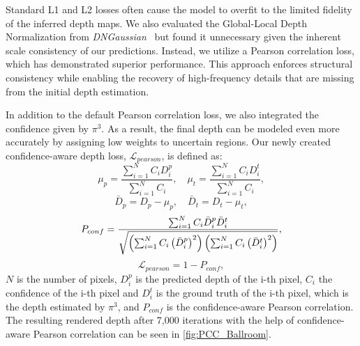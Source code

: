Standard L1 and L2 losses often cause the model to overfit to the limited fidelity of the inferred depth maps. We also evaluated the Global-Local Depth Normalization from \textit{DNGaussian}~\cite{DNGaussian} but found it unnecessary given the inherent scale consistency of our predictions. Instead, we utilize a Pearson correlation loss, which has demonstrated superior performance. This approach enforces structural consistency while enabling the recovery of high-frequency details that are missing from the initial depth estimation.

In addition to the default Pearson correlation loss, we also integrated the confidence given by $\pi^3$. As a result, the final depth can be modeled even more accurately by assigning low weights to uncertain regions.
Our newly created confidence-aware depth loss, $\mathcal{L}_{pearson}$, is defined as:
\begin{equation}
    \mu_p = \frac{\sum^N_{i=1} C_i D^p_{i}}{\sum^N_{i=1} C_i}, \quad \mu_t = \frac{\sum^N_{i=1} C_i D^t_{i}}{\sum^N_{i=1} C_i},
\end{equation}
\begin{equation}
    \bar{D}_p = D_p - \mu_p, \quad \bar{D}_t = D_t - \mu_t,
\end{equation}
\begin{equation}
    \small
    P_{conf} = \frac{\sum^N_{i=1} C_i \bar{D}^p_{i} \bar{D}^t_{i}}{\sqrt{\left(\sum^N_{i=1} C_i \left(\bar{D}^p_{i}\right)^2\right)\left(\sum^N_{i=1} C_i \left(\bar{D}^t_{i}\right)^2\right)} },
\end{equation}
\begin{equation}
    \mathcal{L}_{pearson} = 1- P_{conf},
\end{equation}
$N$ is the number of pixels, $D^p_{i}$ is the predicted depth of the i-th pixel, $C_i$ the confidence of the i-th pixel and $D^t_{i}$ is the ground truth of the i-th pixel, which is the depth estimated by $\pi^3$, and $P_{conf}$ is the confidence-aware Pearson correlation.
The resulting rendered depth after 7,000 iterations with the help of confidence-aware Pearson correlation can be seen in \cref{fig:PCC_Ballroom}.

